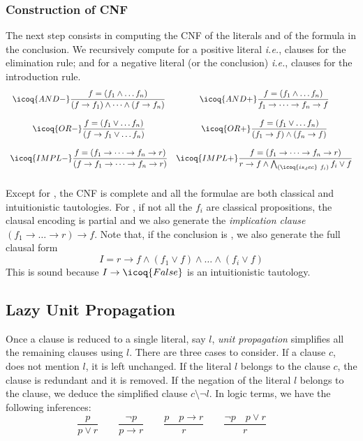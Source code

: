 \documentclass[a4paper,UKenglish,cleveref, autoref, thm-restate]{lipics-v2019}
\begin{document}
\subsubsection{Construction of CNF}
The next step consists in computing the CNF of the literals and of the
formula in the conclusion.  We recursively compute for a positive literal
 \emph{i.e.}, clauses for the elimination rule; and for a
negative literal (or the conclusion)  \emph{i.e.}, clauses
for the introduction rule.
\[
  \begin{array}{cc}
  \icoq{AND-} \dfrac{ f = (f_1 \land \dots f_n) }
  { (f \to f_1) \land \dots \land (f \to f_n) } &
    \icoq{AND+} \dfrac{ f = (f_1 \land \dots f_n) }
    { f_1 \to \dots \to f_n \to f } \\\\
    \icoq{OR-}  \dfrac{ f = (f_1 \lor \dots f_n) }
    { (f \to f_1 \lor \dots f_n) } &
    \icoq{OR+}  \dfrac{ f = (f_1 \lor \dots f_n) }
    { (f_1 \to  f) \land  (f_n \to f) }\\\\
    \icoq{IMPL-}  \dfrac{ f = (f_1 \to \dots \to f_n \to r) }
                   { (f \to f_1 \to \dots \to f_n \to r) } &
    \icoq{IMPL+}  \dfrac{ f = (f_1 \to \dots \to f_n \to r) }
                   { r \to f \land \bigwedge_{(\icoq{is_dec}\ f_i)} f_i \lor f   }\\\\
  \end{array}
\]
Except for , the CNF is complete and all the formulae are
both classical and intuitionistic tautologies.
%
For , if not all the $f_i$ are classical propositions, the
clausal encoding is partial and we also generate the \emph{implication
  clause} $(f_1 \to \dots \to r) \to f$. Note that, if the conclusion
is , we also generate the full clausal form
\[
  I = r \to f \land (f_1 \lor f) \land \dots \land (f_i \lor f)
\]
This is sound because $I \to \icoq{False}$ is an intuitionistic tautology.

\subsection{Lazy Unit Propagation}

Once a clause is reduced to a single literal, say $l$, \emph{unit
  propagation} simplifies all the remaining clauses using $l$. There
are three cases to consider.  If a clause $c$, does not mention $l$,
it is left unchanged. If the literal $l$ belongs to the clause $c$,
the clause is redundant and it is removed. If the negation of the
literal $l$ belongs to the clause, we deduce the simplified clause
$c \setminus \neg l$. In logic terms, we have the following inferences:
\[
  \dfrac{ p }{ p \lor r } \qquad
  \dfrac {\neg p }{ p \to r } \qquad 
  \dfrac{p \quad p \to r}
  { r }  \qquad
  \dfrac{\neg p \quad p \lor r}{r} 
  \qquad
\]
\end{document}
